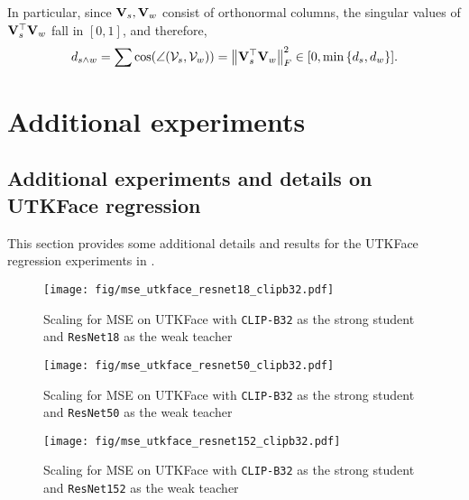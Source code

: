 In particular, since $\mathbf{V}_s, \mathbf{V}_w$ consist of orthonormal columns, the singular values of $\mathbf{V}_s^\top \mathbf{V}_w$ fall in $[0,1]$, and therefore,
\begin{align*}
    d_{s \wedge w} = \sum \cos(\angle(\mathcal{V}_s, \mathcal{V}_w)) = \left\|\mathbf{V}_s^\top \mathbf{V}_w\right\|_F^2 \in [0, \min\left\{d_s, d_w\right\}].
\end{align*}




\section{Additional experiments}\label{apx:exp_details}

\subsection{Additional experiments and details on UTKFace regression}\label{apx:exp_img_reg}
This section provides some additional details and results for the UTKFace regression experiments in . 

\begin{figure}[!h]
    \centering
    \texttt{[image: fig/mse\_utkface\_resnet18\_clipb32.pdf]}%
    \caption{Scaling for MSE on UTKFace with \texttt{CLIP-B32} as the strong student and \texttt{ResNet18} as the weak teacher}\label{fig:mse_utkface_resnet18-clip}
\end{figure}

\begin{figure}[!h]
    \centering
    \texttt{[image: fig/mse\_utkface\_resnet50\_clipb32.pdf]}%
    \caption{Scaling for MSE on UTKFace with \texttt{CLIP-B32} as the strong student and \texttt{ResNet50} as the weak teacher}\label{fig:mse_utkface_resnet50-clip}
\end{figure}

\begin{figure}[!h]
    \centering
    \texttt{[image: fig/mse\_utkface\_resnet152\_clipb32.pdf]}%
    \caption{Scaling for MSE on UTKFace with \texttt{CLIP-B32} as the strong student and \texttt{ResNet152} as the weak teacher}\label{fig:mse_utkface_resnet152-clip}
\end{figure}

